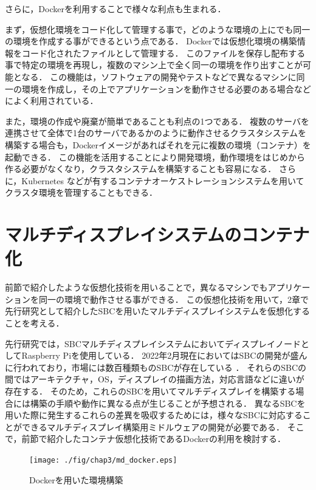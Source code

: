 さらに，Dockerを利用することで様々な利点も生まれる．

まず，仮想化環境をコード化して管理する事で，どのような環境の上にでも同一の環境を作成する事ができるという点である．
Dockerでは仮想化環境の構築情報をコード化されたファイルとして管理する．
このファイルを保存し配布する事で特定の環境を再現し，複数のマシン上で全く同一の環境を作り出すことが可能となる．
この機能は，ソフトウェアの開発やテストなどで異なるマシンに同一の環境を作成し，その上でアプリケーションを動作させる必要のある場合などによく利用されている．

また，環境の作成や廃棄が簡単であることも利点の1つである．
複数のサーバを連携させて全体で1台のサーバであるかのように動作させるクラスタシステムを構築する場合も，Dockerイメージがあればそれを元に複数の環境（コンテナ）を起動できる．
この機能を活用することにより開発環境，動作環境をはじめから作る必要がなくなり，クラスタシステムを構築することも容易になる．
さらに，Kubernetes \cite{k8s}などが有するコンテナオーケストレーションシステムを用いてクラスタ環境を管理することもできる．

\section{マルチディスプレイシステムのコンテナ化}
前節で紹介したような仮想化技術を用いることで，異なるマシンでもアプリケーションを同一の環境で動作させる事ができる．
この仮想化技術を用いて，2章で先行研究として紹介したSBCを用いたマルチディスプレイシステムを仮想化することを考える．

先行研究では，SBCマルチディスプレイシステムにおいてディスプレイノードとしてRaspberry Piを使用している．
2022年2月現在においてはSBCの開発が盛んに行われており，市場には数百種類ものSBCが存在している \cite{hackerbords}．
それらのSBCの間ではアーキテクチャ，OS，ディスプレイの描画方法，対応言語などに違いが存在する．
そのため，これらのSBCを用いてマルチディスプレイを構築する場合には構築の手順や動作に異なる点が生じることが予想される．
異なるSBCを用いた際に発生するこれらの差異を吸収するためには，様々なSBCに対応することができるマルチディスプレイ構築用ミドルウェアの開発が必要である．
そこで，前節で紹介したコンテナ仮想化技術であるDockerの利用を検討する．

\begin{figure}[H]
    \hspace*{\fill}
    \texttt{[image: ./fig/chap3/md\_docker.eps]}
    \hspace*{\fill}
    \caption{Dockerを用いた環境構築}
    \label{docker_usage}
\end{figure}

